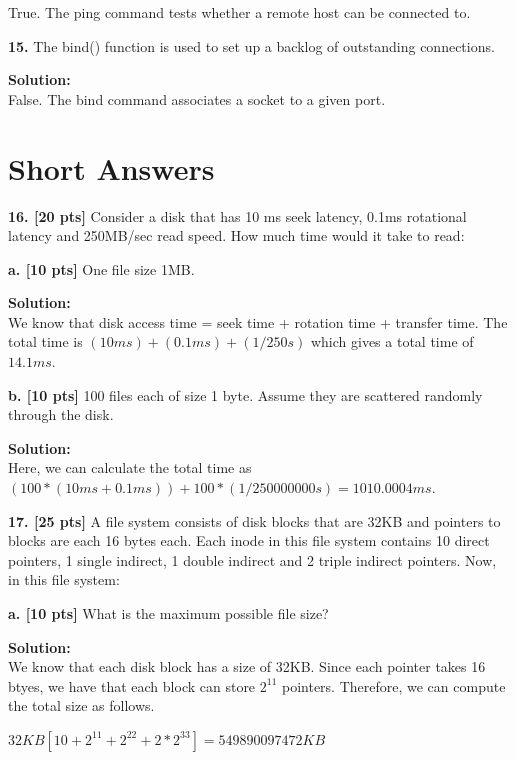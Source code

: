 \documentclass[12pt]{article}
\begin{document}
True. The ping command tests whether a remote host can be connected to. 

{\bf 15.} The bind() function is used to set up a backlog of outstanding connections. 

{\bf Solution:}\\

False. The bind command associates a socket to a given port. 

\section{Short Answers}

{\bf 16. [20 pts]} Consider a disk that has 10 ms seek latency, 0.1ms rotational latency and 250MB/sec read speed. How much time would it take to read:

{\bf a. [10 pts]} One file size 1MB. 

{\bf Solution:}\\

We know that disk access time = seek time + rotation time + transfer time. The total time is $(10ms)+(0.1ms)+(1/250s)$ which gives a total time of $14.1ms$. 

{\bf b. [10 pts]} 100 files each of size 1 byte. Assume they are scattered randomly through the disk. 

{\bf Solution:}\\

Here, we can calculate the total time as $(100*(10ms+0.1ms))+100*(1/250000000s)=1010.0004ms$. 

{\bf 17. [25 pts]} A file system consists of disk blocks that are 32KB and pointers to blocks are each 16 bytes each. Each inode in this file system contains 10 direct pointers, 1 single indirect, 1 double indirect and 2 triple indirect pointers. Now, in this file system:

{\bf a. [10 pts]} What is the maximum possible file size?

{\bf Solution:}\\

We know that each disk block has a size of 32KB. Since each pointer takes 16 btyes, we have that each block can store $2^{11}$ pointers. Therefore, we can compute the total size as follows.

\begin{center}
$32KB[10+2^{11}+2^{22}+2*2^{33}]=549890097472KB$\\
\end{center}
\end{document}
